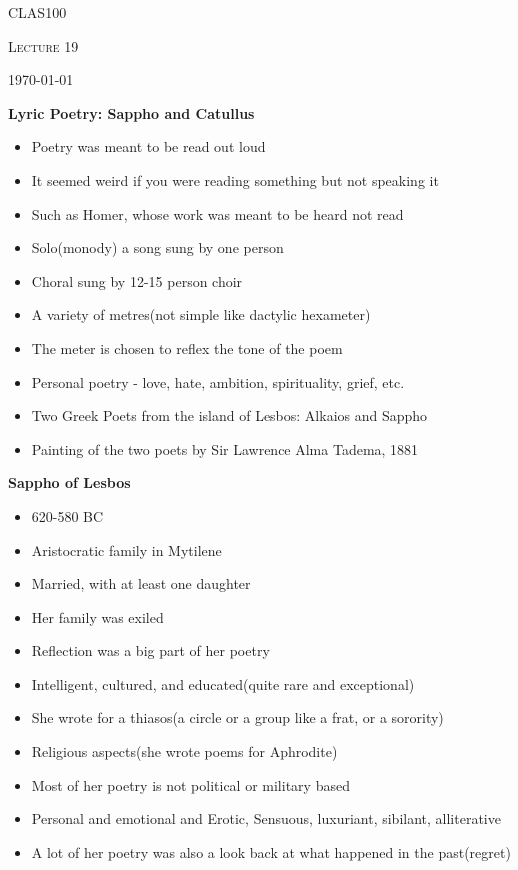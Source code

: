 \documentclass[12pt,a4paper]{report}
\begin{document}
	\centering
	{\scshape\LARGE CLAS100 \par}
	{\scshape\Large Lecture 19\par}
	{\large \today\par}
	\vspace{1.5cm}

\textbf{Lyric Poetry: Sappho and Catullus}
\begin{itemize}
\item Poetry was meant to be read out loud
\item It seemed weird if you were reading something but not speaking it
\item Such as Homer, whose work was meant to be heard not read
\item Solo(monody) a song sung by one person
\item Choral sung by 12-15 person choir
\item A variety of metres(not simple like dactylic hexameter)
\item The meter is chosen to reflex the tone of the poem
\item Personal poetry - love, hate, ambition, spirituality, grief, etc.
\item Two Greek Poets from the island of Lesbos: Alkaios and Sappho
\item Painting of the two poets by Sir Lawrence Alma Tadema, 1881
\end{itemize}
\textbf{Sappho of Lesbos}
\begin{itemize}
\item 620-580 BC
\item Aristocratic family in Mytilene
\item Married, with at least one daughter
\item Her family was exiled
\item Reflection was a big part of her poetry
\item Intelligent, cultured, and educated(quite rare and exceptional)
\item She wrote for a thiasos(a circle or a group like a frat, or a sorority)
\item Religious aspects(she wrote poems for Aphrodite)
\item Most of her poetry is not political or military based
\item Personal and emotional and Erotic, Sensuous, luxuriant, sibilant, alliterative
\item A lot of her poetry was also a look back at what happened in the past(regret)
\end{itemize}
\end{document}
